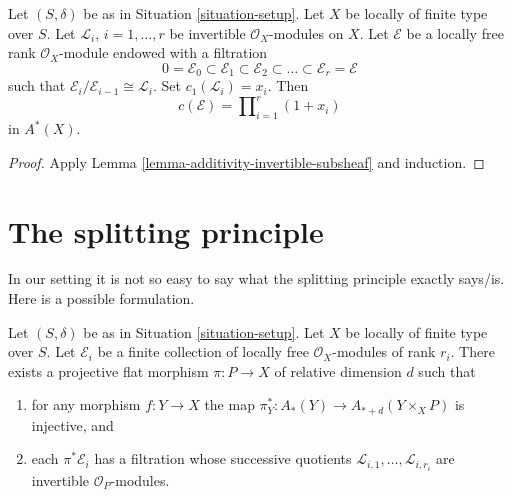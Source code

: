 \begin{lemma}
\label{lemma-chern-filter-by-linebundles}
Let $(S, \delta)$ be as in Situation \ref{situation-setup}.
Let $X$ be locally of finite type over $S$.
Let ${\mathcal L}_i$, $i = 1, \ldots, r$ be invertible
$\mathcal{O}_X$-modules on $X$.
Let $\mathcal{E}$ be a locally free rank
$\mathcal{O}_X$-module endowed with a filtration
$$
0 = \mathcal{E}_0 \subset \mathcal{E}_1 \subset \mathcal{E}_2
\subset \ldots \subset \mathcal{E}_r = \mathcal{E}
$$
such that $\mathcal{E}_i/\mathcal{E}_{i - 1} \cong \mathcal{L}_i$.
Set $c_1({\mathcal L}_i) = x_i$. Then
$$
c(\mathcal{E})
=
\prod\nolimits_{i = 1}^r (1 + x_i)
$$
in $A^*(X)$.
\end{lemma}

\begin{proof}
Apply Lemma \ref{lemma-additivity-invertible-subsheaf} and induction.
\end{proof}





\section{The splitting principle}
\label{section-splitting-principle}

\noindent
In our setting it is not so easy to say what the splitting principle
exactly says/is. Here is a possible formulation.

\begin{lemma}
\label{lemma-splitting-principle}
Let $(S, \delta)$ be as in Situation \ref{situation-setup}. Let $X$ be locally
of finite type over $S$. Let $\mathcal{E}_i$ be a finite collection of
locally free $\mathcal{O}_X$-modules of rank $r_i$. There exists a projective
flat morphism $\pi : P \to X$ of relative dimension $d$ such that
\begin{enumerate}
\item for any morphism $f : Y \to X$ the map
$\pi_Y^* : A_*(Y) \to A_{* + d}(Y \times_X P)$ is injective, and
\item each $\pi^*\mathcal{E}_i$ has a filtration
whose successive quotients $\mathcal{L}_{i, 1}, \ldots, \mathcal{L}_{i, r_i}$
are invertible ${\mathcal O}_P$-modules.
\end{enumerate}
\end{lemma}

